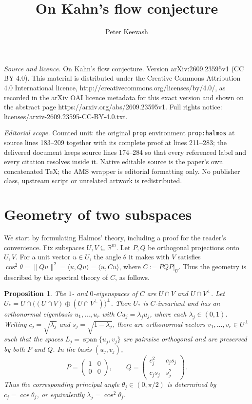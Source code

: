 \documentclass[10pt,a4paper]{amsart}
\newtheorem{prop}[theo]{Proposition}
\newcommand{\mb}[1]{\mathbb{#1}}
\newcommand{\sub}{\subseteq}
\begin{document}
\title[On Kahn's flow conjecture]{On Kahn's flow conjecture}
\author{Peter Keevash}
\date{}
\maketitle
\noindent\emph{Source and licence.} On Kahn's flow conjecture. Version arXiv:2609.23595v1 (CC BY 4.0). This material is distributed under the Creative Commons Attribution 4.0 International licence, http://creativecommons.org/licenses/by/4.0/, as recorded in the arXiv OAI licence metadata for this exact version and shown on the abstract page https://arxiv.org/abs/2609.23595v1. Full rights notice: licenses/arxiv-2609.23595-CC-BY-4.0.txt.\par\smallskip
\noindent\textit{Editorial scope.} Counted unit: the original \texttt{prop} environment \texttt{prop:halmos} at source lines 183--209 together with its complete proof at lines 211--283; the delivered document keeps source lines 174--284 so that every referenced label and every citation resolves inside it. Native editable source is the paper's own concatenated TeX; the AMS wrapper is editorial formatting only. No publisher class, upstream script or unrelated artwork is redistributed.
\section{Geometry of two subspaces}

We start by formulating Halmos' theory, including a proof for the reader's convenience.
Fix subspaces $U,V\sub\mb R^m$. Let $P,Q$ be orthogonal projections onto $U,V$.
For a unit vector $u\in U$, the angle $\theta$ it makes with $V$ satisfies
$\cos^2 \theta = \|Qu\|^2 = \langle u,Qu\rangle = \langle u,Cu\rangle$, where $C:=PQP|_U$. 
Thus the geometry is described by the spectral theory of $C$, as follows.



\begin{prop}\label{prop:halmos}
The $1$- and $0$-eigenspaces of $C$ are $U \cap V$ and $U \cap V^\perp$.
Let \( U_*= U\cap\bigl((U\cap V)\oplus(U\cap V^\perp)\bigr)^\perp\).
Then $U_*$ is $C$-invariant and has an orthonormal eigenbasis
$u_1,\ldots,u_r$ with \(Cu_j=\lambda_j u_j\),
where each \( \lambda_j \in (0,1) \).
Writing $c_j=\sqrt{\lambda_j}$ and $s_j=\sqrt{1-\lambda_j}$, there are
orthonormal vectors $v_1,\ldots,v_r\in U^\perp$ such that the spaces
$L_j=\operatorname{span}\{u_j,v_j\}$ are pairwise orthogonal and are
preserved by both $P$ and $Q$.  In the basis $(u_j,v_j)$,
\begin{equation}\label{eq:halmos-block}
 P=
 \begin{pmatrix}
  1&0\\
  0&0
 \end{pmatrix},
 \qquad
 Q=
 \begin{pmatrix}
  c_j^2&c_js_j\\
  c_js_j&s_j^2
 \end{pmatrix}.
\end{equation}
Thus the corresponding principal angle $\theta_j\in(0,\pi/2)$ is
determined by $c_j=\cos\theta_j$, or equivalently
$\lambda_j=\cos^2\theta_j$.
\end{prop}
\end{document}

